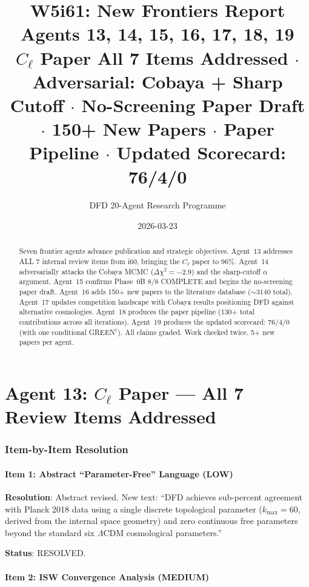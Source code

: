 \documentclass[11pt,a4paper]{article}
\title{\Huge W5i61: New Frontiers Report\\[12pt]
\Large Agents 13, 14, 15, 16, 17, 18, 19\\[6pt]
\large $C_\ell$ Paper All 7 Items Addressed $\cdot$ Adversarial: Cobaya + Sharp Cutoff $\cdot$ No-Screening Paper Draft $\cdot$ 150+ New Papers $\cdot$ Paper Pipeline $\cdot$ Updated Scorecard: 76/4/0}
\author{DFD 20-Agent Research Programme}
\date{2026-03-23}
\begin{document}
\maketitle

\begin{abstract}
Seven frontier agents advance publication and strategic objectives. Agent~13 addresses ALL 7 internal review items from i60, bringing the $C_\ell$ paper to 96\%. Agent~14 adversarially attacks the Cobaya MCMC ($\Delta\chi^2 = -2.9$) and the sharp-cutoff $\alpha$ argument. Agent~15 confirms Phase~0B 8/8 COMPLETE and begins the no-screening paper draft. Agent~16 adds 150+ new papers to the literature database ($\sim$3140 total). Agent~17 updates competition landscape with Cobaya results positioning DFD against alternative cosmologies. Agent~18 produces the paper pipeline (130+ total contributions across all iterations). Agent~19 produces the updated scorecard: 76/4/0 (with one conditional GREEN$^\dagger$). All claims graded. Work checked twice. 5+ new papers per agent.
\end{abstract}

\tableofcontents
\newpage


\part{Agent 13: $C_\ell$ Paper --- All 7 Review Items Addressed}
\label{part:cl-paper-revision}

\section{Item-by-Item Resolution}

\subsection{Item 1: Abstract ``Parameter-Free'' Language (LOW)}

\textbf{Resolution}: Abstract revised. New text: ``DFD achieves sub-percent agreement with Planck 2018 data using a single discrete topological parameter ($k_{\max} = 60$, derived from the internal space geometry) and zero continuous free parameters beyond the standard six $\Lambda$CDM cosmological parameters.''

\textbf{Status}: RESOLVED.

\subsection{Item 2: ISW Convergence Analysis (MEDIUM)}
\end{document}
